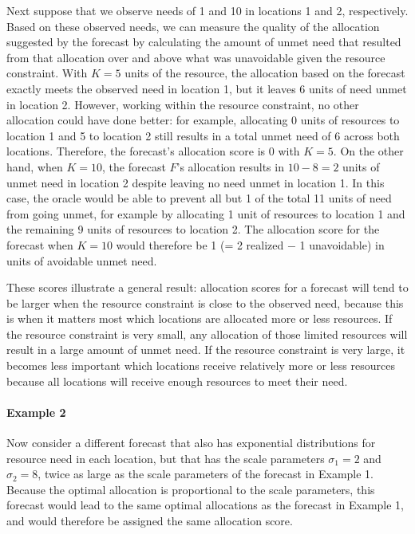 \documentclass{article}\usepackage[]{graphicx}\usepackage[]{xcolor}
\begin{document}
Next suppose that we observe needs of 1 and 10 in locations 1 and 2, respectively.
Based on these observed needs, we can measure the quality of the allocation suggested by the forecast by calculating the amount of unmet need that resulted from that allocation over and above what was unavoidable given the resource constraint.
With $K = 5$ units of the resource, the allocation based on the forecast exactly meets the observed need in location 1, but it leaves 6 units of need unmet in location 2.
However, working within the resource constraint, no other allocation could have done better: for example, allocating 0 units of resources to location 1 and 5 to location 2 still results in a total unmet need of 6 across both locations. Therefore, the forecast's allocation score is 0 with $K = 5$.
On the other hand, when $K = 10$, the forecast $F$'s allocation results in $10 - 8 = 2$ units of unmet need in location 2 despite leaving no need unmet in location 1.
In this case, the oracle would be able to prevent all but 1 of the total 11 units of need from going unmet, for example by allocating 1 unit of resources to location 1 and the remaining 9 units of resources to location 2.
The allocation score for the forecast when $K = 10$ would therefore be 1 (= 2 realized $-$ 1 unavoidable) in units of avoidable unmet need.

These scores illustrate a general result: allocation scores for a forecast will tend to be larger when the resource constraint is close to the observed need, because this is when it matters most which locations are allocated more or less resources. If the resource constraint is very small, any allocation of those limited resources will result in a large amount of unmet need. If the resource constraint is very large, it becomes less important which locations receive relatively more or less resources because all locations will receive enough resources to meet their need.

\paragraph{Example 2} Now consider a different forecast that also has exponential distributions for resource need in each location, but that has the scale parameters $\sigma_1 = 2$ and $\sigma_2 = 8$, twice as large as the scale parameters of the forecast in Example 1. Because the optimal allocation is proportional to the scale parameters, this forecast would lead to the same optimal allocations as the forecast in Example 1, and would therefore be assigned the same allocation score.
\end{document}

